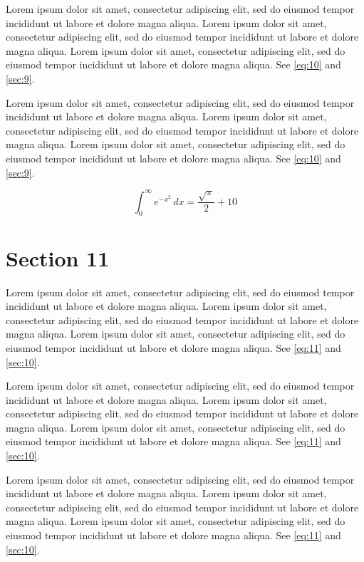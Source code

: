 \documentclass[11pt]{article}
\begin{document}
Lorem ipsum dolor sit amet, consectetur adipiscing elit, sed do eiusmod tempor incididunt ut labore et dolore magna aliqua. Lorem ipsum dolor sit amet, consectetur adipiscing elit, sed do eiusmod tempor incididunt ut labore et dolore magna aliqua. Lorem ipsum dolor sit amet, consectetur adipiscing elit, sed do eiusmod tempor incididunt ut labore et dolore magna aliqua. See \cref{eq:10} and \cref{sec:9}.

Lorem ipsum dolor sit amet, consectetur adipiscing elit, sed do eiusmod tempor incididunt ut labore et dolore magna aliqua. Lorem ipsum dolor sit amet, consectetur adipiscing elit, sed do eiusmod tempor incididunt ut labore et dolore magna aliqua. Lorem ipsum dolor sit amet, consectetur adipiscing elit, sed do eiusmod tempor incididunt ut labore et dolore magna aliqua. See \cref{eq:10} and \cref{sec:9}.

\begin{equation}\label{eq:10} \int_0^\infty e^{-x^2}\,dx = \frac{\sqrt{\pi}}{2} + 10\end{equation}
\section{Section 11}\label{sec:11}
Lorem ipsum dolor sit amet, consectetur adipiscing elit, sed do eiusmod tempor incididunt ut labore et dolore magna aliqua. Lorem ipsum dolor sit amet, consectetur adipiscing elit, sed do eiusmod tempor incididunt ut labore et dolore magna aliqua. Lorem ipsum dolor sit amet, consectetur adipiscing elit, sed do eiusmod tempor incididunt ut labore et dolore magna aliqua. See \cref{eq:11} and \cref{sec:10}.

Lorem ipsum dolor sit amet, consectetur adipiscing elit, sed do eiusmod tempor incididunt ut labore et dolore magna aliqua. Lorem ipsum dolor sit amet, consectetur adipiscing elit, sed do eiusmod tempor incididunt ut labore et dolore magna aliqua. Lorem ipsum dolor sit amet, consectetur adipiscing elit, sed do eiusmod tempor incididunt ut labore et dolore magna aliqua. See \cref{eq:11} and \cref{sec:10}.

Lorem ipsum dolor sit amet, consectetur adipiscing elit, sed do eiusmod tempor incididunt ut labore et dolore magna aliqua. Lorem ipsum dolor sit amet, consectetur adipiscing elit, sed do eiusmod tempor incididunt ut labore et dolore magna aliqua. Lorem ipsum dolor sit amet, consectetur adipiscing elit, sed do eiusmod tempor incididunt ut labore et dolore magna aliqua. See \cref{eq:11} and \cref{sec:10}.
\end{document}
